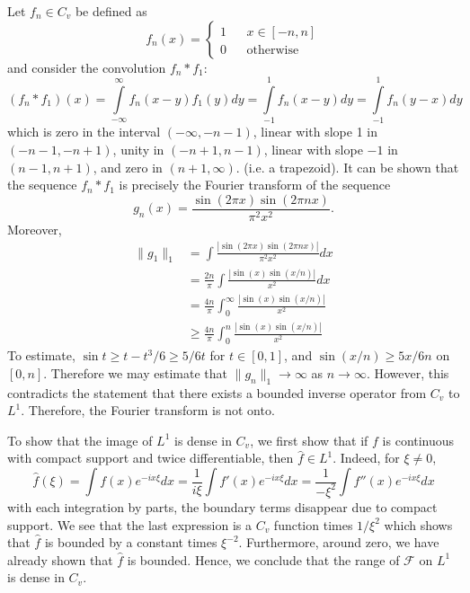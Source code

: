 \documentclass[letterpaper,twoside,11pt]{article}
\theoremstyle{mystyle}
\begin{document}
Let $f_n \in C_v$ be defined as 
\[f_n(x) = \left\{ \begin{matrix}
  1 && x\in [-n, n]\\[.2cm]
  0 && \text{otherwise}
\end{matrix} \right. \]
and consider the convolution $f_n \ast f_1:$ 
\[(f_n\ast f_1) (x) = \int\limits_{-\infty}^{\infty} f_n(x-y) f_1(y) dy = \int\limits_{-1}^1 f_n(x-y)dy = \int\limits_{-1}^1 f_n(y-x)dy\]
which is zero in the interval $(-\infty, -n-1)$, linear with slope 1 in $(-n-1, -n+1)$, unity in $(-n+1, n-1)$, linear with slope $-1$ in $(n-1, n+1)$, and zero in $(n+1, \infty)$. (i.e. a trapezoid). 
It can be shown that the sequence $f_n \ast f_1$ is precisely the Fourier transform of the sequence 
\[g_n(x) = \frac{\sin\left( 2\pi x \right)\sin\left( 2\pi nx \right)}{\pi^2 x^2 }.\]
Moreover, 
\begin{align*}
  \|g_1\|_1 &= \int\frac{|\sin\left( 2\pi x \right)\sin\left( 2\pi nx \right)|}{\pi^2 x^2 } dx \\
  &= \frac{2n}{\pi} \int \frac{|\sin(x) \sin(x/n)|}{x^2}dx \\
  &= \frac{4n}{\pi} \int_{0}^{\infty}\frac{|\sin(x) \sin(x/n)|}{x^2}\\
  &\geq \frac{4n}{\pi} \int_{0}^{n}\frac{|\sin(x) \sin(x/n)|}{x^2}
\end{align*}
To estimate, $\sin t \geq t-t^3/6 \geq 5/6t$ for $t \in [0,1]$, and $\sin(x/n)\geq 5x/6n$ on $[0,n]$. Therefore we may estimate that $\|g_n\|_1 \to \infty$ as $n\to \infty $. However, this contradicts the statement that there exists a bounded inverse operator from $C_v$ to $L^1$. Therefore, the Fourier transform is not onto. 



To show that the image of $L^1$ is dense in $C_v$, we first show that if $f$ is continuous with compact support and twice differentiable, then $\hat f \in L^1$. Indeed, for $\xi\neq 0$, 
\[\hat f (\xi) =\int f(x) e^{-ix\xi}dx = \frac{1}{i\xi}\int f'(x) e^{-ix\xi}dx = \frac{1}{-\xi^2}\int f''(x) e^{-ix\xi}dx\]
with each integration by parts, the boundary terms disappear due to compact support. 
We see that the last expression is a $C_v$ function times $1/\xi^2$ which shows that $\hat f$ is bounded by a constant times $\xi^{-2}$. Furthermore, around zero, we have already shown that $\hat f$ is bounded. Hence, we conclude that the range of $\mathcal F$ on $L^1$ is dense in $C_v$. 
\end{document}
